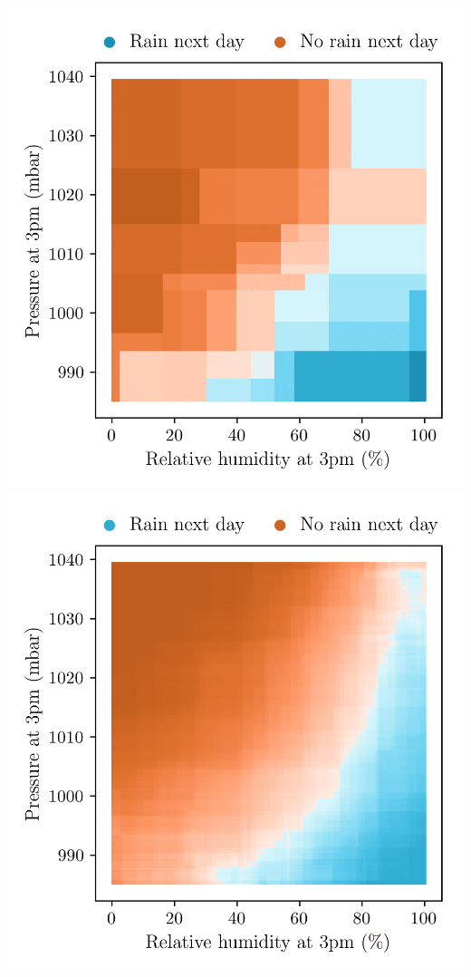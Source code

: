 \documentclass{article}
\begin{document}
\includegraphics[scale=0.5]{graphics/weather_forest_2.png}
\includegraphics[scale=0.5]{graphics/weather_forest_30.png}
\end{document}
